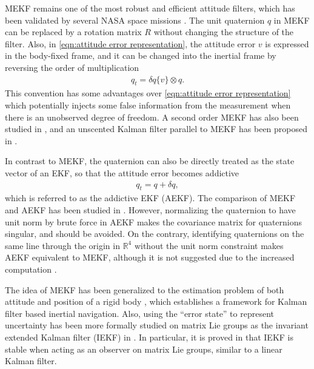 MEKF remains one of the most robust and efficient attitude filters, which has been validated by several NASA space missions \cite{crassidis2007survey}.
The unit quaternion $q$ in MEKF can be replaced by a rotation matrix $R$ without changing the structure of the filter.
Also, in \eqref{eqn:attitude error representation}, the attitude error $v$ is expressed in the body-fixed frame, and it can be changed into the inertial frame by reversing the order of multiplication
\begin{align} \label{eqn:attitude error representation-inertial}
	q_t = \delta q\{v\} \otimes q.
\end{align}
This convention has some advantages over \eqref{eqn:attitude error representation} \cite{gai1985star,li2012improving} which potentially injects some false information from the measurement when there is an unobserved degree of freedom.
A second order MEKF has also been studied in \cite{markley2003attitude}, and an unscented Kalman filter parallel to MEKF has been proposed in \cite{crassidis2003unscented}.

In contrast to MEKF, the quaternion can also be directly treated as the state vector of an EKF, so that the attitude error becomes addictive
\begin{align}
	q_t = q + \delta q,
\end{align}
which is referred to as the addictive EKF (AEKF).
The comparison of MEKF and AEKF has been studied in \cite{markley2004attitude,shuster2003constraint2,shuster2003constraint1}.
However, normalizing the quaternion to have unit norm by brute force in AEKF makes the covariance matrix for quaternions singular, and should be avoided.
On the contrary, identifying quaternions on the same line through the origin in $\mathbb{R}^4$ without the unit norm constraint makes AEKF equivalent to MEKF, although it is not suggested due to the increased computation \cite{markley2004attitude}.

The idea of MEKF has been generalized to the estimation problem of both attitude and position of a rigid body \cite{sola2017quaternion}, which establishes a framework for Kalman filter based inertial navigation.
Also, using the ``error state'' to represent uncertainty has been more formally studied on matrix Lie groups as the invariant extended Kalman filter (IEKF) in \cite{barrau2014intrinsic,barrau2016invariant,barrau2018invariant}.
In particular, it is proved in \cite{barrau2016invariant} that IEKF is stable when acting as an observer on matrix Lie groups, similar to a linear Kalman filter.


